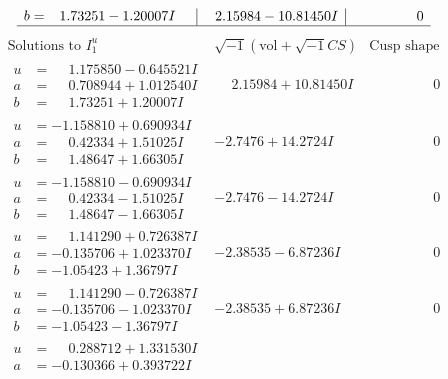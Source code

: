 \documentclass[1p]{elsarticle_modified}
\theoremstyle{definition}
\newcommand{\I}{\sqrt{-1}}
\begin{document}
$$\begin{array}{c|c|c}
\begin{aligned}
b &= \phantom{-}1.73251 - 1.20007 I\end{aligned}
 & \phantom{-}2.15984 - 10.81450 I & \phantom{-0.000000 } 0\\
 \hline 
 \end{array}$$\newpage$$\begin{array}{c|c|c}  
\text{Solutions to }I^u_{1}& \I (\text{vol} + \sqrt{-1}CS) & \text{Cusp shape}\\
 \hline 
\begin{aligned}
u &= \phantom{-}1.175850 - 0.645521 I \\
a &= \phantom{-}0.708944 + 1.012540 I \\
b &= \phantom{-}1.73251 + 1.20007 I\end{aligned}
 & \phantom{-}2.15984 + 10.81450 I & \phantom{-0.000000 } 0 \\ \hline\begin{aligned}
u &= -1.158810 + 0.690934 I \\
a &= \phantom{-}0.42334 + 1.51025 I \\
b &= \phantom{-}1.48647 + 1.66305 I\end{aligned}
 & -2.7476 + 14.2724 I & \phantom{-0.000000 } 0 \\ \hline\begin{aligned}
u &= -1.158810 - 0.690934 I \\
a &= \phantom{-}0.42334 - 1.51025 I \\
b &= \phantom{-}1.48647 - 1.66305 I\end{aligned}
 & -2.7476 - 14.2724 I & \phantom{-0.000000 } 0 \\ \hline\begin{aligned}
u &= \phantom{-}1.141290 + 0.726387 I \\
a &= -0.135706 + 1.023370 I \\
b &= -1.05423 + 1.36797 I\end{aligned}
 & -2.38535 - 6.87236 I & \phantom{-0.000000 } 0 \\ \hline\begin{aligned}
u &= \phantom{-}1.141290 - 0.726387 I \\
a &= -0.135706 - 1.023370 I \\
b &= -1.05423 - 1.36797 I\end{aligned}
 & -2.38535 + 6.87236 I & \phantom{-0.000000 } 0 \\ \hline\begin{aligned}
u &= \phantom{-}0.288712 + 1.331530 I \\
a &= -0.130366 + 0.393722 I \\

\end{aligned}
\end{array}$$
\end{document}
